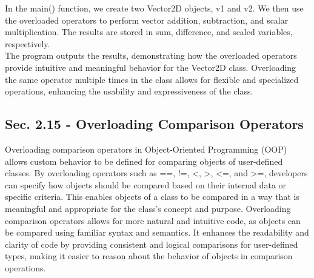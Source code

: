 \begin{solution}
    \noindent In the main() function, we create two Vector2D objects, v1 and v2. We then use the overloaded operators to perform vector addition, subtraction, and scalar multiplication. The results are stored in sum, difference, and scaled variables, respectively. \\

    \noindent The program outputs the results, demonstrating how the overloaded operators provide intuitive and meaningful behavior for the Vector2D class. Overloading the same operator multiple times in the class allows for flexible and specialized operations, enhancing the usability and expressiveness of the class. \\
\end{solution}

\subsection*{Sec. 2.15 - Overloading Comparison Operators}

Overloading comparison operators in Object-Oriented Programming (OOP) allows custom behavior to be defined for comparing objects of user-defined classes. By overloading operators such as ==, !=, <, >, <=, and >=, developers can specify how objects should be compared based on their internal data or specific criteria. This 
enables objects of a class to be compared in a way that is meaningful and appropriate for the class's concept and purpose. Overloading comparison operators allows for more natural and intuitive code, as objects can be compared using familiar syntax and semantics. It enhances the readability and clarity of code by providing 
consistent and logical comparisons for user-defined types, making it easier to reason about the behavior of objects in comparison operations. \\

